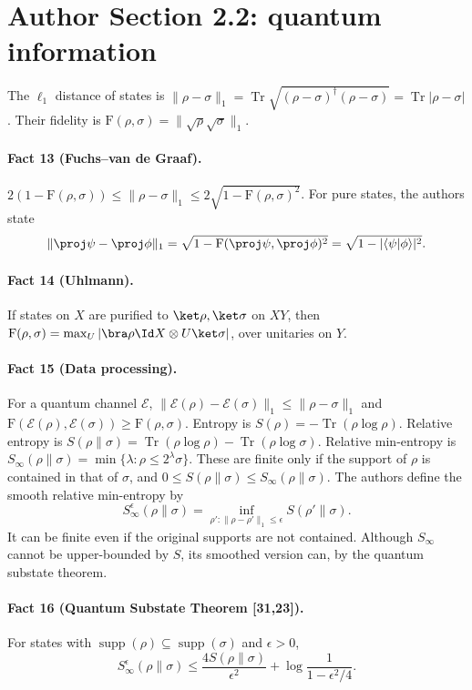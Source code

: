 \section*{Author Section 2.2: quantum information}
The $\ell_1$ distance of states is $\|\rho-\sigma\|_1=\operatorname{Tr}\sqrt{(\rho-\sigma)^\dagger(\rho-\sigma)}=\operatorname{Tr}|\rho-\sigma|$. Their fidelity is $\mathrm F(\rho,\sigma)=\|\sqrt\rho\sqrt\sigma\|_1$.
\paragraph{Fact 13 (Fuchs--van de Graaf).} $2(1-\mathrm F(\rho,\sigma))\le\|\rho-\sigma\|_1\le2\sqrt{1-\mathrm F(\rho,\sigma)^2}$. For pure states, the authors state
\[\|\proj\psi-\proj\phi\|_1=\sqrt{1-\mathrm F(\proj\psi,\proj\phi)^2}=\sqrt{1-|\langle\psi|\phi\rangle|^2}.\]
\paragraph{Fact 14 (Uhlmann).} If states on $X$ are purified to $\ket\rho,\ket\sigma$ on $XY$, then $\mathrm F(\rho,\sigma)=\max_U|\bra\rho\Id X\otimes U\ket\sigma|$, over unitaries on $Y$.
\paragraph{Fact 15 (Data processing).} For a quantum channel $\mathcal E$, $\|\mathcal E(\rho)-\mathcal E(\sigma)\|_1\le\|\rho-\sigma\|_1$ and $\mathrm F(\mathcal E(\rho),\mathcal E(\sigma))\ge\mathrm F(\rho,\sigma)$.
Entropy is $S(\rho)=-\operatorname{Tr}(\rho\log\rho)$. Relative entropy is $S(\rho\|\sigma)=\operatorname{Tr}(\rho\log\rho)-\operatorname{Tr}(\rho\log\sigma)$. Relative min-entropy is $S_\infty(\rho\|\sigma)=\min\{\lambda:\rho\le2^\lambda\sigma\}$. These are finite only if the support of $\rho$ is contained in that of $\sigma$, and $0\le S(\rho\|\sigma)\le S_\infty(\rho\|\sigma)$. The authors define the smooth relative min-entropy by
\[S_\infty^\epsilon(\rho\|\sigma)=\inf_{\rho':\|\rho-\rho'\|_1\le\epsilon}S(\rho'\|\sigma).\]
It can be finite even if the original supports are not contained. Although $S_\infty$ cannot be upper-bounded by $S$, its smoothed version can, by the quantum substate theorem.
\paragraph{Fact 16 (Quantum Substate Theorem [31,23]).} For states with $\operatorname{supp}(\rho)\subseteq\operatorname{supp}(\sigma)$ and $\epsilon>0$,
\[S_\infty^\epsilon(\rho\|\sigma)\le\frac{4S(\rho\|\sigma)}{\epsilon^2}+\log\frac1{1-\epsilon^2/4}.\]
